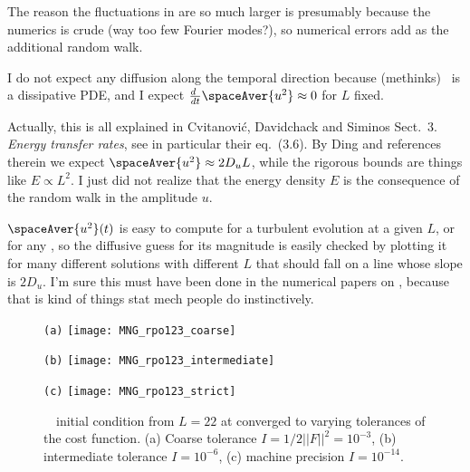 \begin{description}
{The reason the fluctuations in  are so much
larger is presumably because the numerics is crude (way too few Fourier modes?),
so numerical errors add as the additional random walk.

I do not expect any diffusion along the
temporal direction because (methinks) \KS\ is a dissipative PDE, and I expect
$\frac{d~}{dt}\spaceAver{u^2}\approx 0$ for $L$ fixed.

Actually, this is all explained in Cvitanovi{\'c}, Davidchack and
Siminos Sect.~3. {\em Energy transfer rates}, see in particular their
eq.~(3.6). By Ding \etal{} and references therein we expect
$\spaceAver{u^2}\approx 2D_u L$, while the rigorous bounds are things like
$E\propto L^2$. I just did not realize that the energy density $E$ is
the consequence of the random walk in the amplitude $u$.

$\spaceAver{u^2}(t)$ is easy to compute for a turbulent evolution
at a given $L$, or for any \twot, so the diffusive
guess for its magnitude is easily checked by plotting it for many different
solutions with different $L$ that should fall on a line whose slope is $2D_u$.
I'm sure this must have been done in the numerical papers on \KS, because that
is kind of things stat mech people do instinctively.
    }


\begin{figure}
\begin{minipage}[height=.20\textheight]{.30\textwidth}
\centering \small{\texttt{(a)}}
\texttt{[image: MNG\_rpo123\_coarse]}
\end{minipage}
\begin{minipage}[height=.20\textheight]{.30\textwidth}
\centering \small{\texttt{(b)}}
\texttt{[image: MNG\_rpo123\_intermediate]}
\end{minipage}
\begin{minipage}[height=.20\textheight]{.30\textwidth}
\centering \small{\texttt{(c)}}
\texttt{[image: MNG\_rpo123\_strict]}
\end{minipage}
\caption{ \label{fig:MNG_visual_inspection}
\rpo\ \twot\ initial condition from $L=22$ at converged to varying tolerances
of the cost function.
(a) Coarse tolerance $I = 1/2 ||F||^2 = 10^{-3}$,
(b) intermediate tolerance $I = 10^{-6}$,
(c) machine precision $I = 10^{-14}$.
}
\end{figure}


\end{description}
